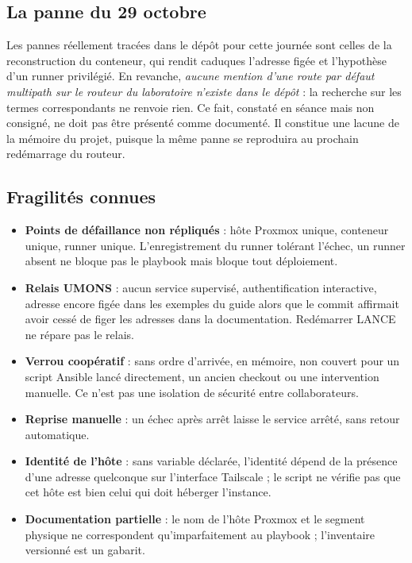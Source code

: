 \subsection{La panne du 29 octobre}

Les pannes réellement tracées dans le dépôt pour cette journée sont celles de la
reconstruction du conteneur, qui rendit caduques l'adresse figée et l'hypothèse
d'un runner privilégié. En revanche, \emph{aucune mention d'une route par défaut
multipath sur le routeur du laboratoire n'existe dans le dépôt} : la recherche
sur les termes correspondants ne renvoie rien. Ce fait, constaté en séance mais
non consigné, ne doit pas être présenté comme documenté. Il constitue une
lacune de la mémoire du projet, puisque la même panne se reproduira au prochain
redémarrage du routeur.

\subsection{Fragilités connues}

\begin{itemize}
\item \textbf{Points de défaillance non répliqués} : hôte Proxmox unique,
conteneur unique, runner unique. L'enregistrement du runner tolérant l'échec, un
runner absent ne bloque pas le playbook mais bloque tout déploiement.
\item \textbf{Relais UMONS} : aucun service supervisé, authentification
interactive, adresse encore figée dans les exemples du guide alors que le
commit  affirmait avoir cessé de figer les adresses dans la
documentation. Redémarrer LANCE ne répare pas le relais.
\item \textbf{Verrou coopératif} : sans ordre d'arrivée, en mémoire, non couvert
pour un script Ansible lancé directement, un ancien checkout ou une intervention
manuelle. Ce n'est pas une isolation de sécurité entre collaborateurs.
\item \textbf{Reprise manuelle} : un échec après arrêt laisse le service arrêté,
sans retour automatique.
\item \textbf{Identité de l'hôte} : sans variable déclarée, l'identité dépend de
la présence d'une adresse quelconque sur l'interface Tailscale ; le script ne
vérifie pas que cet hôte est bien celui qui doit héberger l'instance.
\item \textbf{Documentation partielle} : le nom de l'hôte Proxmox et le segment
physique ne correspondent qu'imparfaitement au playbook ; l'inventaire versionné
est un gabarit.
\end{itemize}
